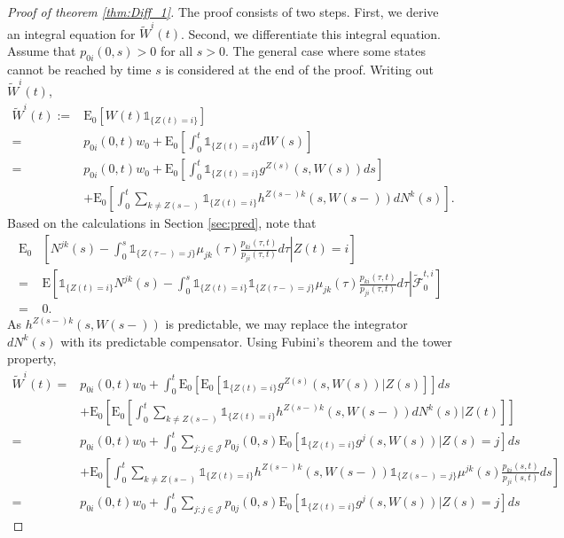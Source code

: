 \documentclass[12pt]{article}
\newcommand{\E}{\text{E}}
\newcommand{\indic}[1]{\mathds{1}_{ \{ #1 \} }}
\theoremstyle{my_thm}
\begin{document}
\begin{proof}[Proof of theorem \ref{thm:Diff_1}]
The proof consists of two steps. First, we derive an integral equation for $\tilde{W}^i(t)$. Second, we differentiate this integral equation. \\
Assume that $p_{0i}(0,s)>0$ for all $s>0$. The general case where some states cannot be reached by time $s$ is considered at the end of the proof. Writing out $\tilde{W}^i(t)$,
\begin{align*}
\tilde{W}^i(t):=&\E_0[W(t) \indic{Z(t)=i}]
\\
=&
p_{0i}(0,t)w_0+\E_0 \left[ \int_0^t \indic{Z(t)=i} dW(s) \right]
\\
=&
p_{0i}(0,t)w_0+\E_0 \left[ \int_0^t \indic{Z(t)=i} g^{Z(s)}(s,W(s))ds \right]
\\
&+
\E_0 \left[ \int_0^t \sum_{k \neq Z(s-)} \indic{Z(t)=i} h^{Z(s-)k}(s,W(s-)) dN^k(s)  \right].
\end{align*}
Based on the calculations in Section \ref{sec:pred}, note that 
\begin{align*}
\E_0 & \left. \left[ N^{jk}(s) - \int_0^s \indic{Z(\tau-)=j} \mu_{jk}(\tau)\frac{p_{ki}(\tau,t)}{p_{ji}(\tau,t)} d\tau \right| Z(t)=i \right] 
\\
=&
\E \left. \left[ \indic{Z(t)=i}N^{jk}(s) - \int_0^s \indic{Z(t)=i} \indic{Z(\tau-)=j} \mu_{jk}(\tau)\frac{p_{ki}(\tau,t)}{p_{ji}(\tau,t)} d\tau \right| \tilde{\mathcal{F}}_0^{t,i} \right]  
\\
=& 0.
\end{align*}
As $h^{Z(s-)k}(s,W(s-))$ is predictable, we may replace the integrator $dN^k(s)$ with its predictable compensator. Using Fubini's theorem and the tower property,
\begin{align}
\tilde{W}^i(t)=& p_{0i}(0,t)w_0+
\nonumber \int_0^t \E_0 \left[ \E_0 \left[ \indic{Z(t)=i} g^{Z(s)}(s,W(s))|Z(s) \right]\right] ds
\\
&+
\nonumber \E_0 \left[ \E_0 \left[ \int_0^t \sum_{k \neq Z(s-)}\indic{Z(t)=i} h^{Z(s-)k}(s,W(s-)) dN^k(s) |Z(t) \right] \right] 
\\
=&
 p_{0i}(0,t)w_0+
\nonumber \int_0^t \sum_{j:j \in \mathcal{J}} p_{0j}(0,s) \E_0 \left[ \indic{Z(t)=i} g^{j}(s,W(s))|Z(s)=j \right]  ds
\\
&+
\nonumber \E_0 \left[ \int_0^t \sum_{k \neq Z(s-)}\indic{Z(t)=i} h^{Z(s-)k}(s,W(s-)) \indic{Z(s-)=j} \mu^{jk}(s) \frac{p_{ki}(s,t)}{p_{ji}(s,t)}ds \right] 
\\
=&
p_{0i}(0,t)w_0+
\nonumber \int_0^t \sum_{j:j \in \mathcal{J}} p_{0j}(0,s) \E_0 \left[ \indic{Z(t)=i} g^{j}(s,W(s))|Z(s)=j \right] ds

\end{align}
\end{proof}
\end{document}
